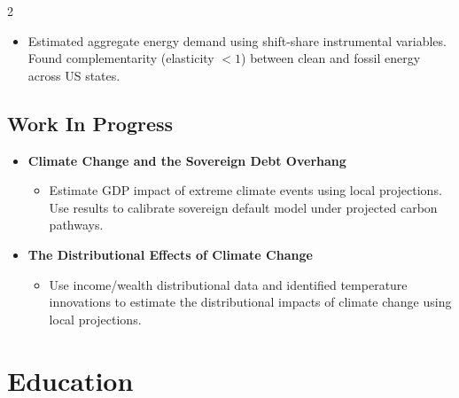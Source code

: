 \documentclass[
	10pt, %
]{FreemanCV}
\begin{document}
\begin{paracol}{2}
\begin{itemize}
	\begin{itemize}
		\item Estimated aggregate energy demand using shift-share instrumental variables. Found complementarity (elasticity $<1$) between clean and fossil energy across US states.
	\end{itemize}

\end{itemize}

\subsection{Work In Progress}

	\begin{itemize}
		\item \textbf{Climate Change and the Sovereign Debt Overhang}
		\begin{itemize}
			\item Estimate GDP impact of extreme climate events using local projections. Use results to calibrate sovereign default model under projected carbon pathways.
		\end{itemize}				
		
		\item \textbf{The Distributional Effects of Climate Change}
		\begin{itemize}
			\item Use income/wealth distributional data and identified temperature innovations to estimate the distributional impacts of climate change using local projections. 
		\end{itemize}
	\end{itemize}

\medskip %



\section{Education} 




\end{paracol}
\end{document}
